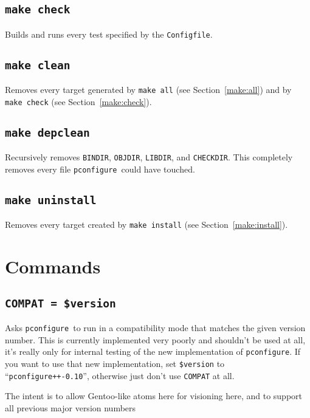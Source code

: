 \documentclass{article}
\newcommand{\pconfigure}{\texttt{pconfigure}}
\begin{document}
\subsection{\texttt{make check} \label{make:check}}

Builds and runs every test specified by the \texttt{Configfile}.

\subsection{\texttt{make clean}}

Removes every target generated by \texttt{make all} (see
Section~\ref{make:all}) and by \texttt{make check} (see
Section~\ref{make:check}).

\subsection{\texttt{make depclean}}

Recursively removes \texttt{BINDIR}, \texttt{OBJDIR}, \texttt{LIBDIR},
and \texttt{CHECKDIR}.  This completely removes every file
\pconfigure\ could have touched.

\subsection{\texttt{make uninstall}}

Removes every target created by \texttt{make install} (see
Section~\ref{make:install}).

\section{Commands \label{cmd}}

\subsection{\texttt{COMPAT = \$version}}

Asks \pconfigure\ to run in a compatibility mode that matches the
given version number.  This is currently implemented very poorly and
shouldn't be used at all, it's really only for internal testing of the
new implementation of \pconfigure.  If you want to use that new
implementation, set \texttt{\$version} to
``\texttt{pconfigure++-0.10}'', otherwise just don't use
\texttt{COMPAT} at all.

The intent is to allow Gentoo-like atoms here for visioning here, and
to support all previous major version numbers
\end{document}
